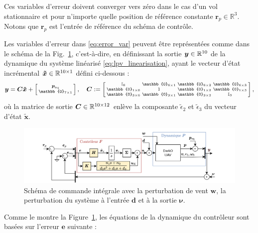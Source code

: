 Ces variables d'erreur doivent converger vers zéro dans le cas d'un vol stationnaire et pour n'importe quelle position de référence constante $\boldsymbol{r}_{p} \in \mathbb{R}^{3}$. Notons que $\boldsymbol{r}_{p}$ est l'entrée de référence du schéma de contrôle.

Les variables d'erreur dans \eqref{eq:error_var} peuvent être représentées comme dans le schéma  de la Fig.~\ref{fig:commande_int6DOF}, c'est-à-dire, en définissant la sortie $\boldsymbol{y}\in {\mathbb R}^{10}$ de la dynamique du système linéarisé \eqref{eq:lpv_linearisation}, ayant le vecteur d'état incrémental $\boldsymbol{\tilde{x}} \in {\mathbb R}^{10 \times 1}$ défini ci-dessous : 
\begin{align}
    \label{eq:output_lin}
    \boldsymbol{y} = \boldsymbol{C} \boldsymbol{\tilde{x}} + \smallmat{\boldsymbol{p}_{\mathrm{eq}} \\ \mathbb{0}_{7 \times 1}}, \quad
 \boldsymbol{C} := \smallmat{\mathbb{I}_{6} & \mathbb{0}_{6\times 1} & \mathbb{0}_{6\times 2} &\mathbb{0}_{6\times 3}\\
    \mathbb{0}_{1\times 6} & 1 & \mathbb{0}_{1\times 2} &\mathbb{0}_{1\times 3}\\
    \mathbb{0}_{3\times 6} & \mathbb{0}_{3\times 1} & \mathbb{0}_{3\times 2} &  \mathbb{I}_{3}
},
\end{align}
où la matrice de sortie $\boldsymbol{C} \in {\mathbb R}^{10\times12}$ enlève la composante $\tilde{\epsilon}_{2}$ et $\tilde{\epsilon}_{3}$ du vecteur d'état $\tilde{\boldsymbol{x}}$. 

\begin{figure}[t!]
    \centering
    \includegraphics[width=0.8\columnwidth]{figures/commande_integrale.png}
    \caption{Schéma de commande intégrale avec la perturbation de vent $\boldsymbol{w}$, la perturbation du système à l'entrée $\boldsymbol{d}$ et à la sortie $\boldsymbol{\nu}$.}
    \label{fig:commande_int6DOF}
\end{figure}

Comme le montre la Figure~\ref{fig:commande_int6DOF}, les équations de la dynamique du contrôleur sont basées sur l'erreur $\boldsymbol{e}$ suivante :

